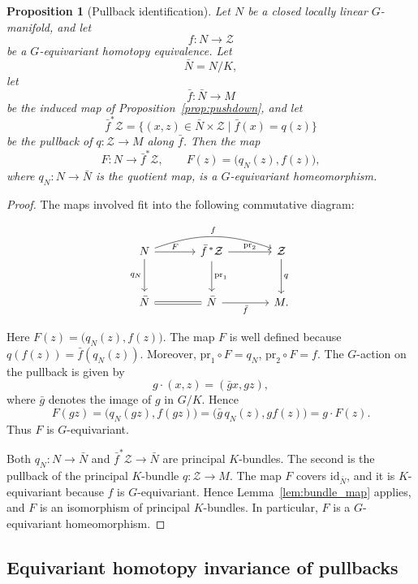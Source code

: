 \documentclass[11pt,a4paper]{article}
\numberwithin{equation}{section}
\newtheorem{prop}[definition]{Proposition}
\theoremstyle{named}
\begin{document}
\begin{prop}[Pullback identification]
\label{prop:pullback_construction}
Let \(N\) be a closed locally linear \(G\)-manifold, and let
\[
    f:N\longrightarrow \mathcal Z
\]
be a \(G\)-equivariant homotopy equivalence. Let
\[
    \bar N=N/K,
\]
let
\[
    \bar f:\bar N\longrightarrow M
\]
be the induced map of Proposition~\ref{prop:pushdown}, and let
\[
    \bar f^*\mathcal Z
    =
    \{(x,z)\in \bar N\times \mathcal Z \mid \bar f(x)=q(z)\}
\]
be the pullback of \(q:\mathcal Z\to M\) along \(\bar f\).  Then the map
\[
    F:N\longrightarrow \bar f^*\mathcal Z,
    \qquad
    F(z)=\bigl(q_N(z),f(z)\bigr),
\]
where \(q_N:N\to \bar N\) is the quotient map, is a \(G\)-equivariant homeomorphism.
\end{prop}

\begin{proof}
The maps involved fit into the following commutative diagram:

\[
\begin{tikzcd}[column sep=large,row sep=large]
N
    \arrow[r,"F"]
    \arrow[d,"q_N"']
    \arrow[rr,bend left=20,"f"]
&
\bar f^{\,*}\mathcal Z
    \arrow[d,"\mathrm{pr}_1"]
    \arrow[r,"\mathrm{pr}_2"]
&
\mathcal Z
    \arrow[d,"q"]
\\
\bar N
    \arrow[r,equal]
&
\bar N
    \arrow[r,"\bar f"']
&
M .
\end{tikzcd}
\]

Here \(F(z)=\bigl(q_N(z),f(z)\bigr)\). The map \(F\) is well defined because \(q(f(z))=\bar f(q_N(z))\). Moreover, \(\mathrm{pr}_1\circ F=q_N\), \(\mathrm{pr}_2\circ F=f\). The \(G\)-action on the pullback is given by
\[
    g\cdot(x,z)=(\bar g x,gz),
\]
where \(\bar g\) denotes the image of \(g\) in \(G/K\). Hence
\[
    F(gz)
    =
    \bigl(q_N(gz),f(gz)\bigr)
    =
    \bigl(\bar g\,q_N(z),g f(z)\bigr)
    =
    g\cdot F(z).
\]
Thus \(F\) is \(G\)-equivariant.

Both \(q_N:N\to \bar N\) and \(\bar f^*\mathcal Z\to \bar N\) are principal \(K\)-bundles. The second is the pullback of the principal \(K\)-bundle \(q:\mathcal Z\to M\). The map \(F\) covers \(\mathrm{id}_{\bar N}\), and it is \(K\)-equivariant because \(f\) is \(G\)-equivariant. Hence Lemma~\ref{lem:bundle_map} applies, and \(F\) is an isomorphism of principal \(K\)-bundles. In particular, \(F\) is a \(G\)-equivariant homeomorphism.
\end{proof}

\subsection{Equivariant homotopy invariance of pullbacks}
\end{document}
